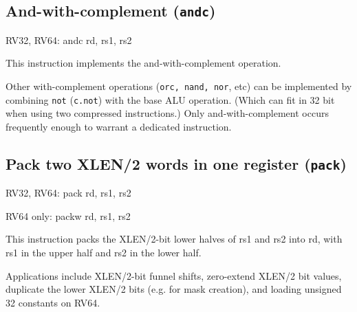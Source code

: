 


\subsection{And-with-complement (\texttt{andc})}

\begin{rvb}
  RV32, RV64:
    andc rd, rs1, rs2
\end{rvb}

This instruction implements the and-with-complement operation.



Other with-complement operations ({\tt orc, nand, nor}, etc) can be implemented
by combining {\tt not} ({\tt c.not}) with the base ALU operation. (Which can
fit in 32 bit when using two compressed instructions.) Only and-with-complement
occurs frequently enough to warrant a dedicated instruction.

%
%
%


\subsection{Pack two XLEN/2 words in one register (\texttt{pack})}

\begin{rvb}
  RV32, RV64:
    pack rd, rs1, rs2

  RV64 only:
    packw rd, rs1, rs2
\end{rvb}

This instruction packs the XLEN/2-bit lower halves of rs1 and rs2 into
rd, with rs1 in the upper half and rs2 in the lower half.



Applications include XLEN/2-bit funnel shifts, zero-extend XLEN/2 bit values, duplicate the lower
XLEN/2 bits (e.g. for mask creation), and loading unsigned 32 constants on RV64.

